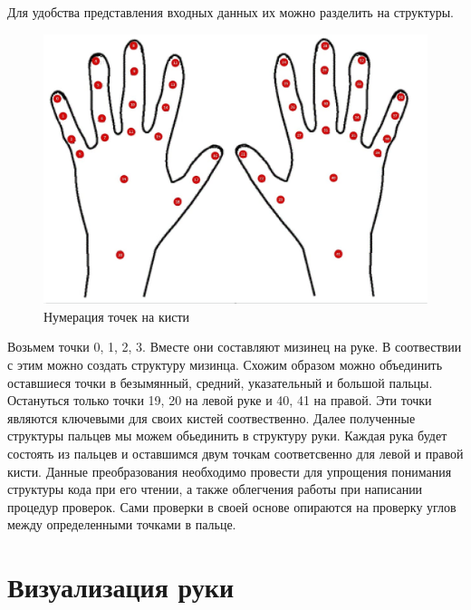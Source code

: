 \hspace{0.6cm}Для удобства представления входных данных их можно разделить на структуры. 
\begin{figure}[ht!]
	\centering
	\includegraphics[scale=0.4]{Kist.jpg}
	\caption{Нумерация точек на кисти}
	\label{fig:hands}
\end{figure}
\hspace{0.6cm}Возьмем точки 0, 1, 2, 3. Вместе они составляют мизинец на руке. В соотвествии с этим можно создать структуру мизинца. Схожим образом можно объединить оставшиеся точки в безымянный, средний, указательный и большой пальцы. Остануться только точки 19, 20 на левой руке и 40, 41 на правой. Эти точки являются ключевыми для своих кистей соотвественно.
\hspace{0.6cm}Далее полученные структуры пальцев мы можем обьединить в структуру руки. Каждая рука будет состоять из пальцев и оставшимся двум точкам соответсвенно для левой и правой кисти. 
\hspace{0.6cm}Данные преобразования необходимо провести для упрощения понимания структуры кода при его чтении, а также облегчения работы при написании процедур проверок.
\hspace{0.6cm}Сами проверки в своей основе опираются на проверку углов между определенными точками в пальце.  

\section{Визуализация руки}


